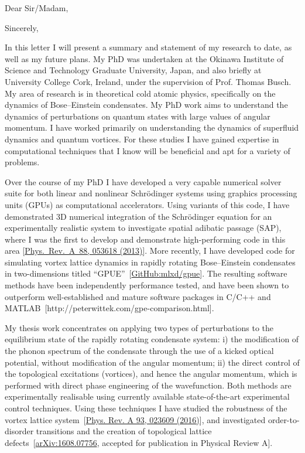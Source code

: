 \documentclass[12pt,a4paper,unicode]{moderncv}
\begin{document}
    \date{\today} %
    \opening{Dear Sir/Madam,}
    \closing{Sincerely,}
    \makelettertitle
{
    In this letter I will present a summary and statement of my research to date, as well as my future plans. My PhD was undertaken at the Okinawa Institute of Science and Technology Graduate University, Japan, and also briefly at University College Cork, Ireland, under the supervision of Prof. Thomas Busch. My area of research is in theoretical cold atomic physics, specifically on the dynamics of Bose--Einstein condensates. My PhD work aims to understand the dynamics of perturbations on quantum states with large values of angular momentum. I have worked primarily on understanding the dynamics of superfluid dynamics and quantum vortices. For these studies I have gained expertise in computational techniques that I know will be beneficial and apt for a variety of problems.

    Over the course of my PhD I have developed a very capable numerical solver suite for both linear and nonlinear Schr\"odinger systems using graphics processing units (GPUs) as computational accelerators. Using variants of this code, I have demonstrated 3D numerical integration of the Schr\"odinger equation for an experimentally realistic system to investigate spatial adibatic passage (SAP), where I was the first to develop and demonstrate high-performing code in this area [\href{http://journals.aps.org/pra/abstract/10.1103/PhysRevA.88.053618}{Phys.~Rev.~A~88, 053618 (2013)}]. More recently, I have developed code for simulating vortex lattice dynamics in rapidly rotating Bose--Einstein condensates in two-dimensions titled ``GPUE''~[\href{https://github.com/mlxd/gpue}{GitHub:mlxd/gpue}]. The resulting software methods have been independently performance tested, and have been shown to outperform well-established and mature software packages in C/C++ and \textsc{MATLAB}~[http://peterwittek.com/gpe-comparison.html].

    My thesis work concentrates on applying two types of perturbations to the equilibrium state of the rapidly rotating condensate system: i) the modification of the phonon spectrum of the condensate through the use of a kicked optical potential, without modification of the angular momentum; ii) the direct control of the topological excitations (vortices), and hence the angular momentum, which is performed with direct phase engineering of the wavefunction. Both methods are experimentally realisable using currently available state-of-the-art experimental control techniques. Using these techniques I have studied the robustness of the vortex lattice system~[\href{http://journals.aps.org/pra/abstract/10.1103/PhysRevA.93.023609}{Phys. Rev. A 93, 023609 (2016)}], and investigated order-to-disorder transitions and the creation of topological lattice defects~[\href{https://arxiv.org/abs/1608.07756}{arXiv:1608.07756}, accepted for publication in Physical Review A].

}
\end{document}
